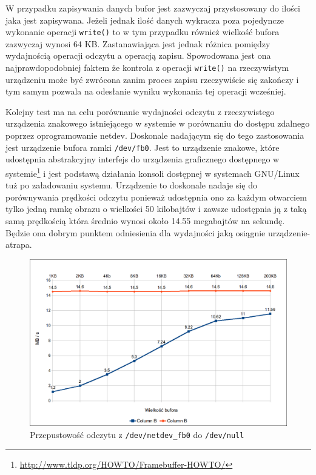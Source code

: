 \documentclass[11pt]{scrartcl}
\begin{document}
W przypadku zapisywania danych bufor jest zazwyczaj przystosowany do ilości jaka jest zapisywana. Jeżeli jednak ilość danych wykracza poza pojedyncze wykonanie operacji \texttt{write()} to w tym przypadku również wielkość bufora zazwyczaj wynosi 64 KB\@. Zastanawiająca jest jednak różnica pomiędzy wydajnością operacji odczytu a operacją zapisu. Spowodowana jest ona najprawdopodobniej faktem że kontrola z operacji \texttt{write()} na rzeczywistym urządzeniu może być zwrócona zanim proces zapisu rzeczywiście się zakończy i tym samym pozwala na odesłanie wyniku wykonania tej operacji wcześniej.

Kolejny test ma na celu porównanie wydajności odczytu z rzeczywistego urządzenia znakowego istniejącego w systemie w porównaniu do dostępu zdalnego poprzez oprogramowanie netdev. Doskonale nadającym się do tego zastosowania jest urządzenie bufora ramki \texttt{/dev/fb0}. Jest to urządzenie znakowe, które udostępnia abstrakcyjny interfejs do urządzenia graficznego dostępnego w systemie\footnote{\url{http://www.tldp.org/HOWTO/Framebuffer-HOWTO/}} i jest podstawą działania konsoli dostępnej w systemach GNU/Linux tuż po załadowaniu systemu. Urządzenie to doskonale nadaje się do porównywania prędkości odczytu ponieważ udostępnia ono za każdym otwarciem tylko jedną ramkę obrazu o wielkości 50 kilobajtów i zawsze udostępnia ją z taką samą prędkością która średnio wynosi około 14.55 megabajtów na sekundę. Będzie ona dobrym punktem odniesienia dla wydajności jaką osiągnie urządzenie-atrapa.

\begin{figure}[H]
    \caption{Przepustowość odczytu z \texttt{/dev/netdev\_fb0} do \texttt{/dev/null}}
    \includegraphics[width=\linewidth]{speeddevfb0}
\end{figure}
\end{document}
